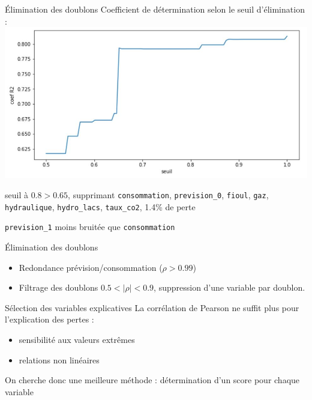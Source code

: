 \begin{frame}[fragile]{Élimination des doublons}
\protect\hypertarget{uxe9limination-des-doublons-1}{}
Coefficient de détermination selon le seuil d'élimination :
\includegraphics[scale=.5]{figures/doublons.JPG}

seuil à \(0.8 > 0.65\), supprimant \texttt{consommation},
\texttt{prevision\_0}, \texttt{fioul}, \texttt{gaz},
\texttt{hydraulique}, \texttt{hydro\_lacs}, \texttt{taux\_co2}, 1.4\% de
perte

\texttt{prevision\_1} moins bruitée que \texttt{consommation}
\end{frame}

\begin{frame}{Élimination des doublons}
\protect\hypertarget{uxe9limination-des-doublons-2}{}
\begin{itemize}
\tightlist
\item
  Redondance prévision/consommation (\(\rho > 0.99\))
\item
  Filtrage des doublons \(0.5 < |\rho| < 0.9\), suppression d'une
  variable par doublon.
\end{itemize}
\end{frame}

\begin{frame}{Sélection des variables explicatives}
\protect\hypertarget{suxe9lection-des-variables-explicatives}{}
La corrélation de Pearson ne suffit plus pour l'explication des pertes :

\begin{itemize}
\tightlist
\item
  sensibilité aux valeurs extrêmes
\item
  relations non linéaires
\end{itemize}

On cherche donc une meilleure méthode : détermination d'un score pour
chaque variable
\end{frame}

